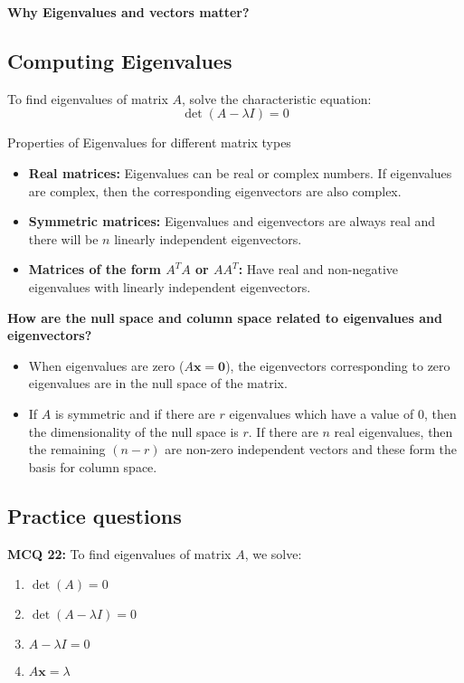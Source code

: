\documentclass[11pt,a4paper]{article}
\theoremstyle{definition}
\begin{document}
\vspace{2em}
\noindent \textbf{Why Eigenvalues and vectors matter?} 

\subsection{Computing Eigenvalues}

To find eigenvalues of matrix $A$, solve the characteristic equation:
\[\det(A - \lambda I) = 0\]

Properties of Eigenvalues for different matrix types
\begin{itemize}
    \item \textbf{Real matrices:} Eigenvalues can be real or complex numbers. If eigenvalues are complex, then the corresponding eigenvectors are also complex. 
    \item \textbf{Symmetric matrices:} Eigenvalues and eigenvectors are always real and there will be $n$ linearly independent eigenvectors.
    \item \textbf{Matrices of the form $A^T A$ or $AA^T$:} Have real and non-negative eigenvalues with linearly independent eigenvectors.
\end{itemize}

\noindent \textbf{How are the null space and column space related to eigenvalues and eigenvectors?}

\begin{itemize}
\item When eigenvalues are zero ($A\mathbf{x} = \mathbf{0}$), the eigenvectors corresponding to zero eigenvalues are in the null space of the matrix. 
\item If $A$ is symmetric and if there are $r$ eigenvalues which have a value of 0, then the dimensionality of the null space is $r$. 
If there are $n$ real eigenvalues, then the remaining $(n-r)$ are non-zero independent vectors and these form the basis for column space.
\end{itemize}

\subsection{Practice questions}

\textbf{MCQ 22:} To find eigenvalues of matrix $A$, we solve:

\begin{enumerate}
    \item $\det(A) = 0$
    \item $\det(A - \lambda I) = 0$
    \item $A - \lambda I = 0$
    \item $A\mathbf{x} = \lambda$
\end{enumerate}
\end{document}
